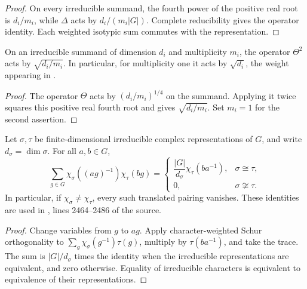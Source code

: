\begin{proof}\leanok
    On every irreducible summand, the fourth power of the positive real root
    is $d_i/m_i$, while $\Delta$ acts by $d_i/(m_i|G|)$.
    Complete reducibility gives the operator identity. Each weighted isotypic
    sum commutes with the representation.
\end{proof}

\begin{lemma}%
    \label{thm:peps_representation_theta_squared}
    \leanok
    On an irreducible summand of dimension $d_i$ and multiplicity $m_i$,
    the operator $\Theta^2$ acts by $\sqrt{d_i/m_i}$. In particular, for
    multiplicity one it acts by $\sqrt{d_i}$, the weight appearing in
    \cite[Section~7]{Schuch2010PEPS}.
\end{lemma}

\begin{proof}\leanok
    The operator $\Theta$ acts by $(d_i/m_i)^{1/4}$ on the summand.
    Applying it twice squares this positive real fourth root and gives
    $\sqrt{d_i/m_i}$. Set $m_i=1$ for the second assertion.
\end{proof}

\begin{lemma}
    \label{thm:peps_translated_character_pairing}
    \leanok
    Let $\sigma,\tau$ be finite-dimensional irreducible complex
    representations of $G$, and write $d_\sigma=\dim\sigma$. For all
    $a,b\in G$,
    \[
        \sum_{g\in G}\chi_\sigma((ag)^{-1})\chi_\tau(bg)
        =\begin{cases}
            \dfrac{|G|}{d_\sigma}\chi_\tau(ba^{-1}), & \sigma\cong\tau,     \\
            0,                                       & \sigma\not\cong\tau.
        \end{cases}
    \]
    In particular, if $\chi_\sigma\ne\chi_\tau$, every such translated pairing
    vanishes. These identities are used in \cite{Schuch2010PEPS}, lines
    2464--2486 of the source.
\end{lemma}

\begin{proof}\leanok
    Change variables from $g$ to $ag$. Apply character-weighted Schur
    orthogonality to $\sum_g\chi_\sigma(g^{-1})\tau(g)$, multiply by
    $\tau(ba^{-1})$, and take the trace. The sum is $|G|/d_\sigma$ times the
    identity when the irreducible representations are equivalent, and zero
    otherwise. Equality of irreducible characters is equivalent to equivalence
    of their representations.
\end{proof}

